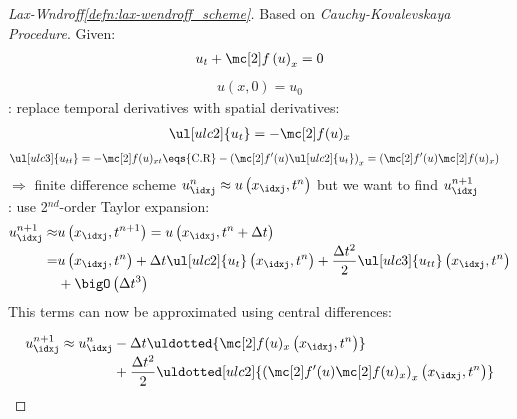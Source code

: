 \begin{proofbox}\nospacing
    \begin{proof}[\newline Lax-Wndroff\cref{defn:lax-wendroff_scheme}]\label{proof:defn:lax-wendroff_scheme}
        Based on \textit{Cauchy-Kovalevskaya Procedure}. Given:
        \begin{align*}
        u_{t}+\flux \left(u\right)_{x}=0
        \end{align*}
        \begin{align*}
        u(x,0)=u_{0}
        \end{align*}
        : replace temporal derivatives with spatial derivatives:
        \begin{align*}
         \ul[ulc2]{u_{t}}=-\flux(u)_{x}
        \end{align*}
        \begin{align*}
         \ul[ulc3]{u_{tt}}&=-\flux(u)_{xt}\eqs{\text{C.R}}-\left(\flux'(u)\ul[ulc2]{u_{t}}\right)_{x}=\left(\flux'(u)\flux(u)_{x}\right)
        \end{align*}
        $\Rightarrow$ finite difference scheme $u_{\idxj}^{n}\approx u\left(x_{\idxj},t^{n}\right)$ but we want to find $u^{n+1}_{\idxj}$\\
        : use 2$^{nd}$-order Taylor expansion:
        \begin{align*}
          u_{\idxj}^{n+1}\approx& u \left(x_{\idxj},t^{n+1}\right)
          =u \left(x_{\idxj},t^{n}+\Delta t\right)\\[-1\jot]
          =&u \left(x_{\idxj},t^{n}\right)+\Delta t \ul[ulc2]{u_{t}} \left(x_{\idxj},t^{n}\right)+\frac{\Delta t^{2}}{2}\ul[ulc3]{u_{tt}} \left(x_{\idxj},t^{n}\right)\\[-1\jot]
          &+\bigO \left(\Delta t^{3}\right)
        \end{align*}
        This terms can now be approximated using central differences:
        \begin{figure}[H]
            \centering{
              \def\svgwidth{140pt}
              \resizebox{0.6\linewidth}{!}{}
            }
        \end{figure}
        \begin{align*}
          u_{\idxj}^{n+1}\approx u_{\idxj}^{n}&-\Delta t\uldotted{\flux(u)_{x} \left(x_{\idxj},t^{n}\right)}\\[-1\jot]
                                  &+\frac{\Delta t^{2}}{2} \uldotted[ulc2]{\left(\flux'(u)\flux(u)_{x}\right)_{x} \left(x_{\idxj},t^{n}\right)}

\end{align*}
\end{proof}
\end{proofbox}

